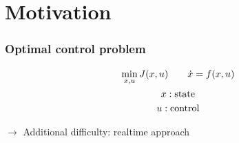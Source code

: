 \section{Motivation}
\begin{frame}
	\frametitle{Optimal control problem}
	\begin{block}{}
	  \begin{gather*}
		\min_{x,u} J(x,u) \qquad \dot{x} = f(x,u) \\
		x: \textup{state} \\
		u: \textup{control} 
		\end{gather*}
	\end{block}
	\vspace{1em}
	 \( \rightarrow \) Additional difficulty: realtime approach
\end{frame}